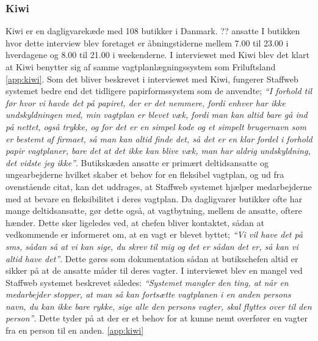 \subsubsection{Kiwi}
Kiwi er en dagligvarekæde med 108 butikker i Danmark. ?? ansatte I butikken hvor dette interview blev foretaget er åbningstiderne mellem 7.00 til 23.00 i hverdagene og 8.00 til 21.00 i weekenderne. %
I interviewet med Kiwi blev det klart at Kiwi benytter sig af samme vagtplanlægningssystem som Friluftsland \ref{app:kiwi}. Som det bliver beskrevet i interviewet med Kiwi, fungerer Staffweb systemet bedre end det tidligere papirformssystem som de anvendte;\textit{ “I forhold til før hvor vi havde det på papiret, der er det nemmere, fordi enhver har ikke undskyldningen med, min vagtplan er blevet væk, fordi man kan altid bare gå ind på nettet, også trykke, og for det er en simpel kode og et simpelt brugernavn som er bestemt af firmaet, så man kan altid finde det, så det er en klar fordel i forhold papir vagtplaner, bare det at det ikke kan blive væk, man har aldrig undskyldning, det vidste jeg ikke”}. Butikskæden ansatte er primært deltidsansatte og ungearbejderne hvilket skaber et behov for en fleksibel vagtplan, og ud fra ovenstående citat, kan det uddrages, at Staffweb systemet hjælper medarbejderne med at bevare en fleksibilitet i deres vagtplan. Da dagligvarer butikker ofte har mange deltidsansatte, gør dette også, at vagtbytning, mellem de ansatte, oftere hænder. Dette sker ligeledes ved, at chefen bliver kontaktet, sådan at vedkommende er informeret om, at en vagt er blevet byttet;\textit{ “Vi vil have det på sms, sådan så at vi kan sige, du skrev til mig og det er sådan det er, så kan vi altid have det”}. Dette gøres som dokumentation sådan at butikschefen altid er sikker på at de ansatte måder til deres vagter.
I interviewet blev en mangel ved Staffweb systemet beskrevet således: \textit{“Systemet mangler den ting, at når en medarbejder stopper, at man så kan fortsætte vagtplanen i en anden persons navn, du kan ikke bare rykke, sige alle den persons vagter, skal flyttes over til den person”}. Dette tyder på at der er et behov for at kunne nemt overfører en vagter fra en person til en anden. \ref{app:kiwi}

